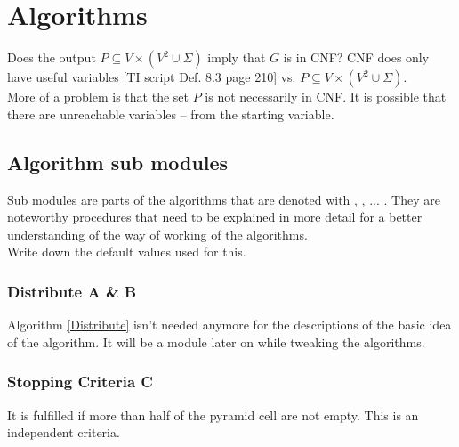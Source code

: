
\section{Algorithms}\label{algorithms}

\noindent Does the output $P \subseteq V \times (V^{2} \cup \Sigma)$ imply that $G$ is in CNF? CNF does only have useful variables [TI script Def. 8.3 page 210] vs. $P \subseteq V \times (V^{2} \cup \Sigma)$.\\
\noindent More of a problem is that the set $P$ is not necessarily in CNF. It is possible that there are unreachable variables -- from the starting variable.

\subsection{Algorithm sub modules}
Sub modules are parts of the algorithms that are denoted with , , ... . They are noteworthy procedures that need to be explained in more detail for a better understanding of the way of working of the algorithms. \\
Write down the default values used for this.\\

\subsubsection{Distribute A \& B}
\noindent
{}
Algorithm \ref{Distribute} isn't needed anymore for the descriptions of the basic idea of the algorithm. It will be a module later on while tweaking the algorithms.

\subsubsection{Stopping Criteria C}
It is fulfilled if more than half of the pyramid cell are not empty. This is an independent criteria.

